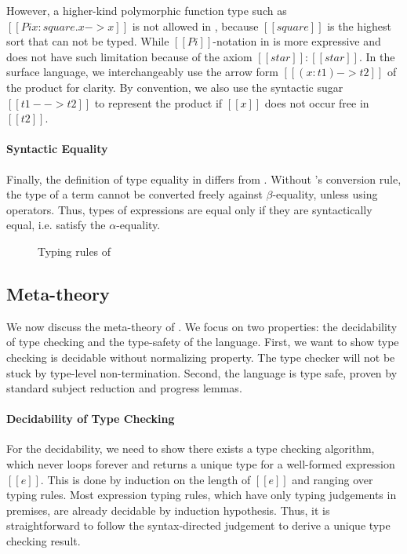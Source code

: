 However, a higher-kind polymorphic function type such as $[[Pi
    x:square.x->x]]$ is not allowed in \cc, because $[[square]]$ is
the highest sort that can not be typed. While $[[Pi]]$-notation in
\ecore is more expressive and does not have such limitation because of
the axiom $[[star]]:[[star]]$. In the surface language, we
interchangeably use the arrow form $[[(x:t1)->t2]]$ of the product for
clarity. By convention, we also use the syntactic sugar $[[t1 -->
    t2]]$ to represent the product if $[[x]]$ does not occur free in
$[[t2]]$.

\paragraph{Syntactic Equality}
Finally, the definition of type equality in \ecore differs from
\cc. Without \cc's conversion rule, the type of a term cannot be
converted freely against $\beta$-equality, unless using \cast
operators. Thus, types of expressions are equal only if they are
syntactically equal, i.e. satisfy the $\alpha$-equality.

\begin{figure}
    \ottdefnctx{}\ottinterrule
    \ottdefnexpr{}
    \caption{Typing rules of \ecore}
    \label{fig:ecore:typing}
\end{figure}

\subsection{Meta-theory}\label{sec:ecore:meta}
We now discuss the meta-theory of \ecore. We focus on two properties: the
decidability of type checking and the type-safety of the language. First, we
want to show type checking \ecore is decidable without normalizing property.
The type checker will not be stuck by type-level non-termination. Second, the
language is type safe, proven by standard subject reduction and progress
lemmas.

\paragraph{Decidability of Type Checking}
For the decidability, we need to show there exists a type checking algorithm,
which never loops forever and returns a unique type for a well-formed
expression $[[e]]$. This is done by induction on the length of $[[e]]$ and
ranging over typing rules. Most expression typing rules, which have only typing
judgements in premises, are already decidable by induction hypothesis. Thus, it
is straightforward to follow the syntax-directed judgement to derive a unique
type checking result.

